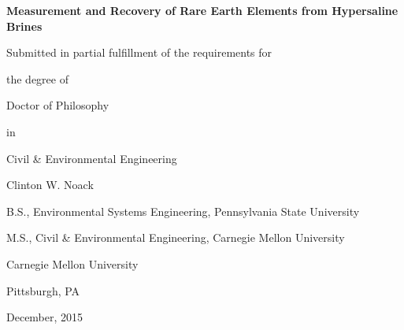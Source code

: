 
\thispagestyle{empty}
\begin{center}

\Huge{\textbf{Measurement and Recovery of Rare Earth Elements from Hypersaline Brines}}
\vspace{1cm}

\normalsize{
Submitted in partial fulfillment of the requirements for

the degree of

Doctor of Philosophy

in

Civil \& Environmental Engineering
}
\vspace{1cm}

\Large{Clinton W. Noack}
\vspace{1cm}

\normalsize{
B.S., Environmental Systems Engineering, Pennsylvania State University

M.S., Civil \& Environmental Engineering, Carnegie Mellon University
}
\vspace{3cm}

\normalsize{
Carnegie Mellon University

Pittsburgh, PA}

December, 2015


\end{center}
\clearpage
